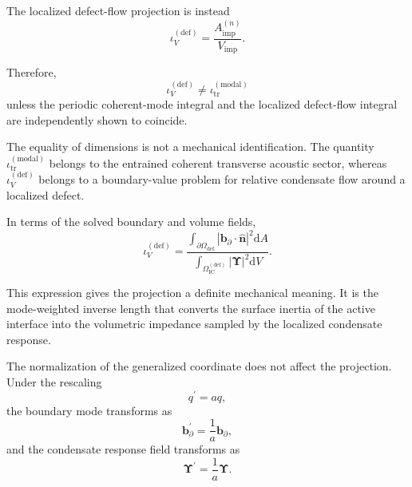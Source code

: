 The localized defect-flow projection is instead
\begin{equation}
    \iota_V^{(\mathrm{def})}
    =
    \frac{
    A_{\mathrm{imp}}^{(n)}
    }{
    V_{\mathrm{imp}}
    } .
\end{equation}

Therefore,
\begin{equation}
    \label{eq:AP_projection_distinction}
    \iota_V^{(\mathrm{def})}
    \neq
    \iota_{\mathrm{tr}}^{(\mathrm{modal})}
\end{equation}
unless the periodic coherent-mode integral and the localized defect-flow integral are independently shown to coincide.

The equality of dimensions is not a mechanical identification. The quantity \(\iota_{\mathrm{tr}}^{(\mathrm{modal})}\) belongs to the entrained coherent transverse acoustic sector, whereas \(\iota_V^{(\mathrm{def})}\) belongs to a boundary-value problem for relative condensate flow around a localized defect.

In terms of the solved boundary and volume fields,
\begin{equation}
    \iota_V^{(\mathrm{def})}
    =
    \frac{
    \displaystyle
    \int_{\partial\Omega_{\mathrm{def}}}
    \left|
    \mathbf{b}_{\partial}\cdot\hat{\mathbf{n}}
    \right|^2
    \mathrm{d}A
    }{
    \displaystyle
    \int_{\Omega_{\mathrm{IC}}^{(\mathrm{def})}}
    \left|
    \boldsymbol{\Upsilon}
    \right|^2
    \mathrm{d}V
    } .
\end{equation}

This expression gives the projection a definite mechanical meaning. It is the mode-weighted inverse length that converts the surface inertia of the active interface into the volumetric impedance sampled by the localized condensate response.

The normalization of the generalized coordinate does not affect the projection. Under the rescaling
\begin{equation}
    q^{\prime}=a q,
\end{equation}
the boundary mode transforms as
\begin{equation}
    \mathbf{b}_{\partial}^{\prime}
    =
    \frac{1}{a}
    \mathbf{b}_{\partial},
\end{equation}
and the condensate response field transforms as
\begin{equation}
    \boldsymbol{\Upsilon}^{\prime}
    =
    \frac{1}{a}
    \boldsymbol{\Upsilon}.
\end{equation}

